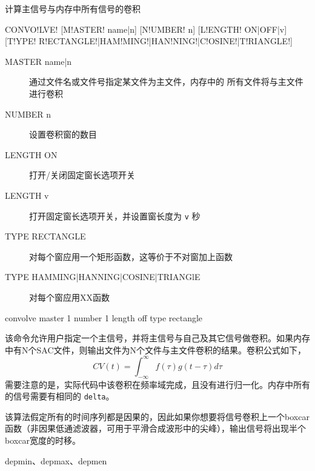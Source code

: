 \label{cmd:convolve}

计算主信号与内存中所有信号的卷积

\begin{SACSTX}
CONVO!LVE! [M!ASTER! name|n] [N!UMBER! n] [L!ENGTH! ON|OFF|v]
    [T!YPE! R!ECTANGLE!|HAM!MING!|HAN!NING!|C!OSINE!|T!RIANGLE!]
\end{SACSTX}

\begin{description}
\item [MASTER name|n] 通过文件名或文件号指定某文件为主文件，内存中的
    所有文件将与主文件进行卷积
\item [NUMBER n] 设置卷积窗的数目
\item [LENGTH ON] 打开/关闭固定窗长选项开关
\item [LENGTH v] 打开固定窗长选项开关，并设置窗长度为 \texttt{v} 秒
\item [TYPE RECTANGLE] 对每个窗应用一个矩形函数，这等价于不对窗加上函数
\item [TYPE HAMMING|HANNING|COSINE|TRIANGlE] 对每个窗应用XX函数
\end{description}

\begin{SACDFT}
convolve master 1 number 1 length off type rectangle
\end{SACDFT}

该命令允许用户指定一个主信号，并将主信号与自己及其它信号做卷积。如果内存
中有N个SAC文件，则输出文件为N个文件与主文件卷积的结果。卷积公式如下，
	\[ CV(t) = \int_{-\infty} ^\infty f(\tau)g(t-\tau)d\tau \]
需要注意的是，实际代码中该卷积在频率域完成，且没有进行归一化。内存中所有
的信号需要有相同的 \texttt{delta}。

该算法假定所有的时间序列都是因果的，因此如果你想要将信号卷积上一个boxcar
函数（非因果低通滤波器，可用于平滑合成波形中的尖峰），输出信号将出现半个
boxcar宽度的时移。

depmin、depmax、depmen
